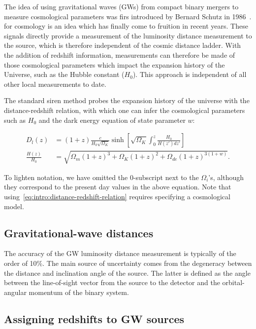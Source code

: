 The idea of using gravitational waves (GWs) from compact
binary mergers to measure cosmological parameters was firs introduced by Bernard Schutz in 1986~\cite{Schutz:1986gp}. for cosmology is an idea
which has finally come to fruition in recent years. These
signals directly provide a measurement of the luminosity
distance measurement to the source, which is therefore
independent of the cosmic distance ladder. With the addition of redshift information, measurements can therefore be made of those cosmological parameters which
impact the expansion history of the Universe, such as
the Hubble constant ($H_0$). This approach is independent of all other local measurements to date.

The standard siren method probes the expansion history of the universe with the distance-redshift relation, with which one can infer the cosmological parameters such as $H_0$ and the dark energy equation of state parameter $w$:~\cite{Hogg:1999ad}

\begin{align}
    \label{eq:intro:distance-redshift-relation}
    D_l(z) &= (1+z)\frac{c}{H_0 \sqrt{\Omega_{K}}} \sinh \left[ \sqrt{\Omega_{K}} \int_0^z \frac{H_0}{H(z') dz'}\right]\\
    \nonumber
    \frac{H(z)}{H_0} &= \sqrt{\Omega_m (1+z)^3 + \Omega_K (1+z)^2 + \Omega_{de} (1+z)^{3(1+w)}}.
\end{align}

To lighten notation, we have omitted the 0-subscript next to the $\Omega_i$'s, although they correspond to the present day values in the above equation. Note that using~\eqref{eq:intro:distance-redshift-relation} requires specifying a cosmological model.

\subsection{Gravitational-wave distances}

The accuracy of the GW luminosity distance measurement is typically of the order of 10\%. The main source of uncertainty comes from the degeneracy between the distance and inclination angle of the source. The latter is defined as the angle between the line-of-sight vector from the source to the detector and the orbital-angular momentum of the binary system.


\subsection{Assigning redshifts to GW sources}

